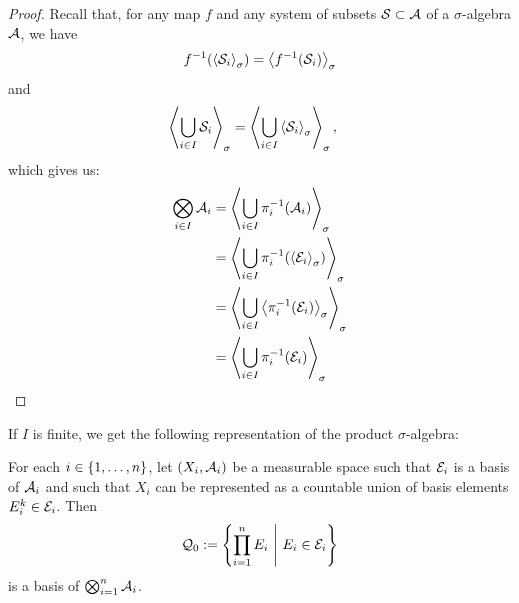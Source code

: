 \begin{proof}
	Recall that, for any map $f$ and any system of subsets $\mathcal{S} \subset \mathcal{A}$ of a $\sigma$-algebra $\mathcal{A}$, we have 
	\begin{align*}
		f^{-1}\qty(\left\langle \mathcal{S}_i \right\rangle_\sigma) = \left\langle f^{-1}(\mathcal{S}_i) \right\rangle_\sigma
	\end{align*}
	and
	\begin{align*}
		\left\langle \bigcup_{i \in I} \mathcal{S}_i \right\rangle_\sigma
		&=
		\left\langle \bigcup_{i \in I}  \left\langle \mathcal{S}_i \right\rangle_\sigma \right\rangle_\sigma,
	\end{align*} which gives us:
	\begin{align*}
		\bigotimes_{i \in I} \mathcal{A}_i 
		&= \left\langle \bigcup_{i \in I} \pi_i^{-1}(\mathcal{A}_i) \right\rangle_\sigma\\
		&= \left\langle \bigcup_{i \in I} \pi_i^{-1}(\left\langle \mathcal{E}_i \right\rangle_\sigma) \right\rangle_\sigma\\
		&= \left\langle \bigcup_{i \in I}\left\langle \pi_i^{-1}(\mathcal{E}_i) \right\rangle_\sigma \right\rangle_\sigma\\
		&= \left\langle \bigcup_{i \in I} \pi_i^{-1}(\mathcal{E}_i) \right\rangle_\sigma
	\end{align*}
\end{proof}
If $I$ is finite, we get the following representation of the product $\sigma$-algebra:
\begin{corollary}
	For each $i \in \qty{1, \hdots, n}$, let $(X_i, \mathcal{A}_i)$ be a measurable space such that $\mathcal{E}_i$ is a basis of $\mathcal{A}_i$ and such that $X_i$ can be represented as a countable union of basis elements $E_i^k \in \mathcal{E}_i$. Then 
	\begin{align*}
		\mathcal{Q}_0 := \qty{\prod_{i = 1}^n E_i ~\middle|~E_i \in \mathcal{E}_i}
	\end{align*}
	is a basis of $\bigotimes_{i = 1}^n \mathcal{A}_i$.
\end{corollary}
